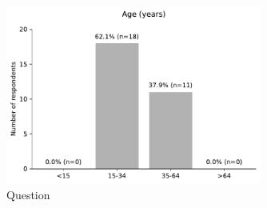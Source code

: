 \begin{figure}[H]
	\centering
	\includegraphics[width=0.75\textwidth]{images/questionnaire/14.pdf}
	\caption{Question}
	\label{fig:architechture}
\end{figure}
